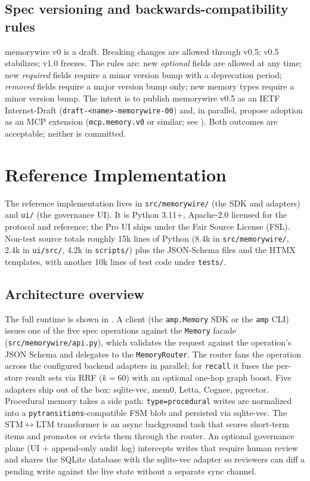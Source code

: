 \documentclass[11pt,letterpaper,twocolumn]{article}
\begin{document}
\subsection{Spec versioning and backwards-compatibility rules}
\label{sec:spec-versioning}

memorywire v0 is a draft. Breaking changes are allowed through v0.5; v0.5 stabilizes; v1.0 freezes. The rules are: new \emph{optional} fields are allowed at any time; new \emph{required} fields require a minor version bump with a deprecation period; \emph{removed} fields require a major version bump only; new memory types require a minor version bump. The intent is to publish memorywire v0.5 as an IETF Internet-Draft (\texttt{draft-<name>-memorywire-00}) and, in parallel, propose adoption as an MCP extension (\texttt{mcp.memory.v0} or similar; see ). Both outcomes are acceptable; neither is committed.

\section{Reference Implementation}
\label{sec:impl}

The reference implementation lives in \texttt{src/memorywire/} (the SDK and adapters) and \texttt{ui/} (the governance UI). It is Python 3.11+, Apache-2.0 licensed for the protocol and reference; the Pro UI ships under the Fair Source License (FSL). Non-test source totals roughly 15k lines of Python (8.4k in \texttt{src/memorywire/}, 2.4k in \texttt{ui/src/}, 4.2k in \texttt{scripts/}) plus the JSON-Schema files and the HTMX templates, with another 10k lines of test code under \texttt{tests/}.

\subsection{Architecture overview}
\label{sec:impl-arch}

The full runtime is shown in . A client (the \texttt{amp.Memory} SDK or the \texttt{amp} CLI) issues one of the five spec operations against the \texttt{Memory} facade (\texttt{src/memorywire/api.py}), which validates the request against the operation's JSON Schema and delegates to the \texttt{MemoryRouter}. The router fans the operation across the configured backend adapters in parallel; for \texttt{recall} it fuses the per-store result sets via RRF ($k=60$) with an optional one-hop graph boost. Five adapters ship out of the box: sqlite-vec, mem0, Letta, Cognee, pgvector. Procedural memory takes a side path: \texttt{type=procedural} writes are normalized into a \texttt{pytransitions}-compatible FSM blob and persisted via sqlite-vec. The STM$\leftrightarrow$LTM transformer is an async background task that scores short-term items and promotes or evicts them through the router. An optional governance plane (UI + append-only audit log) intercepts writes that require human review and shares the SQLite database with the sqlite-vec adapter so reviewers can diff a pending write against the live state without a separate sync channel.
\end{document}
